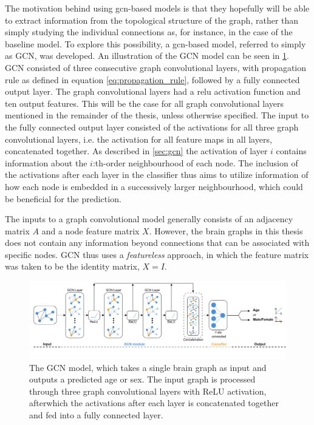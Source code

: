 The motivation behind using \acrshort{gcn}-based models is that they hopefully will be able to extract information from the topological structure of the graph, rather than simply studying the individual connections as, for instance, in the case of the baseline model. To explore this possibility, a \acrshort{gcn}-based model, referred to simply as GCN, was developed. An illustration of the GCN model can be seen in \cref{fig:gcn_base}. GCN consisted of three consecutive graph convolutional layers, with propagation rule as defined in equation \eqref{eq:propagation_rule}, followed by a fully connected output layer. The graph convolutional layers had a \acrfull{relu} activation function and ten output features. This will be the case for all graph convolutional layers mentioned in the remainder of the thesis, unless otherwise specified. The input to the fully connected output layer consisted of the activations for all three graph convolutional layers, i.e. the activation for all feature maps in all layers, concatenated together. As described in \cref{sec:gcn} the activation of layer $i$ contains information about the $i$:th-order neighbourhood of each node. The inclusion of the activations after each layer in the classifier thus aims to utilize information of how each node is embedded in a successively larger neighbourhood, which could be beneficial for the prediction.

The inputs to a graph convolutional model generally consists of an adjacency matrix $A$ and a node feature matrix $X$. However, the brain graphs in this thesis does not contain any information beyond connections that can be associated with specific nodes. GCN thus uses a \textit{featureless} approach, in which the feature matrix was taken to be the identity matrix, $X=I$.

%         

\begin{figure}[!htbp]
    \centering
    \includegraphics[width=\textwidth]{chapters/images_methods/base_v2.png}
    \caption{The GCN model, which takes a single brain graph as input and outputs a predicted age or sex. The input graph is processed through three graph convolutional layers with ReLU activation, afterwhich the activations after each layer is concatenated together and fed into a fully connected layer.}
    \label{fig:gcn_base}
\end{figure}


